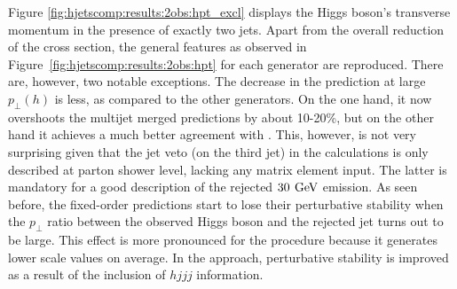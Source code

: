 Figure \ref{fig:hjetscomp:results:2obs:hpt_excl} displays the 
Higgs boson's transverse momentum in the presence of exactly two jets. 
Apart from the overall reduction of the cross section, the general 
features as observed in Figure~\ref{fig:hjetscomp:results:2obs:hpt}
for each generator are reproduced. There are, however, two notable
exceptions. The decrease in the \hjetscompPowheg \hjetscompNNLOPS prediction at large $p_\perp(h)$ 
is less, as compared to
the other generators. On the one hand, it now overshoots the multijet
merged predictions by about 10-20\%, but on the other hand it achieves
a much better agreement with \hjetscompSherpa \hjetscompNNLOPS. This, however, is not
very surprising given that the jet veto (on the third jet) in the
\hjetscompNNLOPS calculations is only described at parton shower level, lacking
any matrix element input. The latter is mandatory for a good
description of the rejected $30\,\text{\:GeV}$ emission. As seen before, the
fixed-order predictions start to lose their perturbative stability when
the $p_\perp$ ratio between the observed Higgs boson and the rejected
jet turns out to be large. This effect is more pronounced for the
\hjetscompMinlo procedure because it generates lower scale values on
average. In the \hjetscompLoopsim approach, perturbative stability is
improved as a result of the inclusion of $hjjj$ information.

